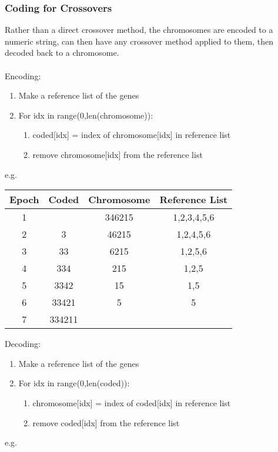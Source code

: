 \subsubsection{Coding for Crossovers}
Rather than a direct crossover method, the chromosomes are encoded to a numeric string, can then have any crossover method applied to them, then decoded back to a chromosome. \\ \\
Encoding:
\begin{enumerate}[label=\Alph*]
\item Make a reference list of the genes
\item For idx in range(0,len(chromosome)):
\begin{enumerate}[label=\arabic*]
    \item coded[idx] = index of chromosome[idx] in reference list
    \item remove chromosome[idx] from the reference list
\end{enumerate}
\end{enumerate}
e.g. 
\begin{table}[H]
\centering
\begin{tabular}{|c|c|c|c|}
\hline
Epoch & Coded & Chromosome & Reference List \\ \hline
1 &  & 346215 & 1,2,3,4,5,6 \\ \hline
2 & 3 & 46215 & 1,2,4,5,6 \\ \hline
3 & 33 & 6215 & 1,2,5,6 \\ \hline
4 & 334 & 215 & 1,2,5 \\ \hline
5 & 3342 & 15 & 1,5 \\ \hline
6 & 33421 & 5 & 5 \\ \hline
7 & 334211 &  &  \\ \hline
\end{tabular}
\end{table}
Decoding:
\begin{enumerate}[label=\Alph*]
\item Make a reference list of the genes
\item For idx in range(0,len(coded)):
\begin{enumerate}[label=\arabic*]
    \item chromosome[idx] = index of coded[idx] in reference list
    \item remove coded[idx] from the reference list
\end{enumerate}
\end{enumerate}
e.g. 
